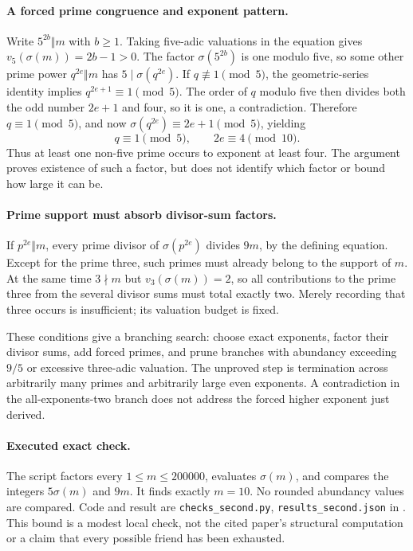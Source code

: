\documentclass[11pt,a4paper]{article}
\begin{document}
\paragraph{A forced prime congruence and exponent pattern.}
Write $5^{2b}\Vert m$ with $b\ge1$. Taking five-adic valuations in
the equation gives $v_5(\sigma(m))=2b-1>0$. The factor
$\sigma(5^{2b})$ is one modulo five, so some other prime power
$q^{2e}\Vert m$ has $5\mid\sigma(q^{2e})$.
If $q\not\equiv1\pmod5$, the geometric-series identity implies
$q^{2e+1}\equiv1\pmod5$. The order of $q$ modulo five then divides
both the odd number $2e+1$ and four, so it is one, a contradiction.
Therefore $q\equiv1\pmod5$, and now
$\sigma(q^{2e})\equiv2e+1\pmod5$, yielding
\[
                   q\equiv1\pmod5,\qquad 2e\equiv4\pmod{10}.
\]
Thus at least one non-five prime occurs to exponent at least four.
The argument proves existence of such a factor, but does not identify
which factor or bound how large it can be.

\paragraph{Prime support must absorb divisor-sum factors.}
If $p^{2e}\Vert m$, every prime divisor of $\sigma(p^{2e})$ divides
$9m$, by the defining equation. Except for the prime three, such primes
must already belong to the support of $m$. At the same time $3\nmid m$
but $v_3(\sigma(m))=2$, so all contributions to the prime three from
the several divisor sums must total exactly two. Merely recording that
three occurs is insufficient; its valuation budget is fixed.

These conditions give a branching search: choose exact exponents,
factor their divisor sums, add forced primes, and prune branches with
abundancy exceeding $9/5$ or excessive three-adic valuation. The
unproved step is termination across arbitrarily many primes and
arbitrarily large even exponents. A contradiction in the all-exponents-two
branch does not address the forced higher exponent just derived.

\paragraph{Executed exact check.}
The script factors every $1\le m\le200000$, evaluates $\sigma(m)$,
and compares the integers $5\sigma(m)$ and $9m$. It finds exactly
$m=10$. No rounded abundancy values are compared. Code and result are
\texttt{checks\_second.py}, \texttt{results\_second.json} in
.
This bound is a modest local check, not the cited paper's structural
computation or a claim that every possible friend has been exhausted.
\end{document}
